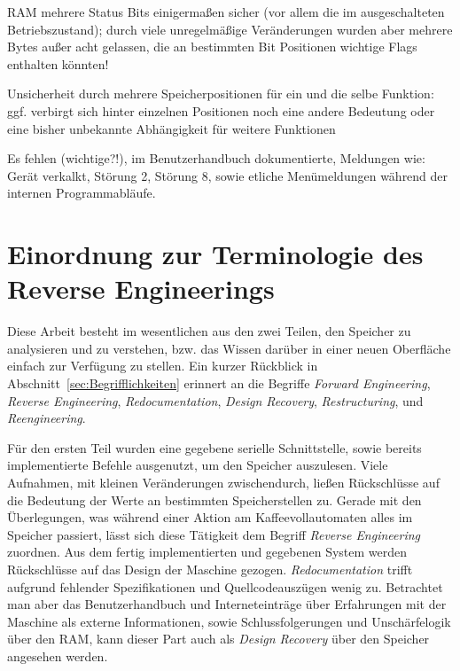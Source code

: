 RAM mehrere Status Bits einigermaßen sicher (vor allem die im ausgeschalteten Betriebszustand); durch viele unregelmäßige Veränderungen wurden aber mehrere Bytes außer acht gelassen, die an bestimmten Bit Positionen wichtige Flags enthalten könnten!

Unsicherheit durch mehrere Speicherpositionen für ein und die selbe Funktion: ggf. verbirgt sich hinter einzelnen Positionen noch eine andere Bedeutung oder eine bisher unbekannte Abhängigkeit für weitere Funktionen

Es fehlen (wichtige?!), im Benutzerhandbuch dokumentierte, Meldungen wie:\label{FehlendeMeldungen}
Gerät verkalkt, Störung 2, Störung 8, sowie etliche Menümeldungen während der internen Programmabläufe.

\section{Einordnung zur Terminologie des Reverse Engineerings}\label{sec:DiskussionBegriffReverseEngineering}
Diese Arbeit besteht im wesentlichen aus den zwei Teilen, den Speicher zu analysieren und zu verstehen, bzw. das Wissen darüber in einer neuen Oberfläche einfach zur Verfügung zu stellen.
Ein kurzer Rückblick in Abschnitt~\ref{sec:Begrifflichkeiten} erinnert an die Begriffe \textit{Forward Engineering}, \textit{Reverse Engineering}, \textit{Redocumentation}, \textit{Design Recovery}, \textit{Restructuring}, und \textit{Reengineering}.

Für den ersten Teil wurden eine gegebene serielle Schnittstelle, sowie bereits implementierte Befehle ausgenutzt, um den Speicher auszulesen.
Viele Aufnahmen, mit kleinen Veränderungen zwischendurch, ließen Rückschlüsse auf die Bedeutung der Werte an bestimmten Speicherstellen zu.
Gerade mit den Überlegungen, was während einer Aktion am Kaffeevollautomaten alles im Speicher passiert, lässt sich diese Tätigkeit dem Begriff \textit{Reverse Engineering} zuordnen.
Aus dem fertig implementierten und gegebenen System werden Rückschlüsse auf das Design der Maschine gezogen.
\textit{Redocumentation} trifft aufgrund fehlender Spezifikationen und Quellcodeauszügen wenig zu.
Betrachtet man aber das Benutzerhandbuch und Interneteinträge über Erfahrungen mit der Maschine als externe Informationen, sowie Schlussfolgerungen und Unschärfelogik über den \ac{RAM}, kann dieser Part auch als \textit{Design Recovery} über den Speicher angesehen werden.

